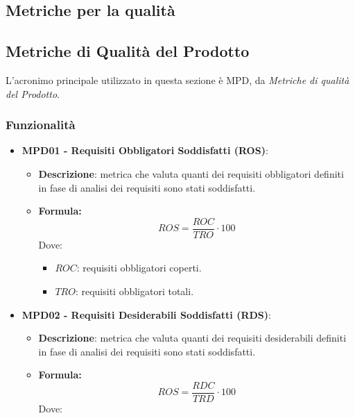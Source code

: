 \documentclass[10pt]{article}
\begin{document}
\begin{justify}
\newpage

\section{Metriche per la qualità}
\label{metriche_qualita}
\subsection{Metriche di Qualità del Prodotto}
L'acronimo principale utilizzato in questa sezione è MPD, da \textit{Metriche di qualità del Prodotto}.

\subsubsection{Funzionalità}
\begin{itemize}
    \item   \textbf{MPD01 - Requisiti Obbligatori Soddisfatti (ROS)}:
            \begin{itemize}
                \item   \textbf{Descrizione}: metrica che valuta quanti dei requisiti obbligatori definiti in fase di analisi dei requisiti sono stati soddisfatti.
                \item   \textbf{Formula:}
                        \[
                        ROS = \frac{ROC}{TRO} \cdot 100
                        \]
                        Dove:
                        \begin{itemize}
                            \item $ROC$: requisiti obbligatori coperti.
                            \item $TRO$: requisiti obbligatori totali.
                        \end{itemize}
            \end{itemize}
    \item   \textbf{MPD02 - Requisiti Desiderabili Soddisfatti (RDS)}:
            \begin{itemize}
                \item   \textbf{Descrizione}: metrica che valuta quanti dei requisiti desiderabili definiti in fase di analisi dei requisiti sono stati soddisfatti.
                \item   \textbf{Formula:}
                        \[
                        ROS = \frac{RDC}{TRD} \cdot 100
                        \]
                        Dove:
                        \begin{itemize}

\end{itemize}
\end{itemize}
\end{itemize}
\end{justify}
\end{document}
